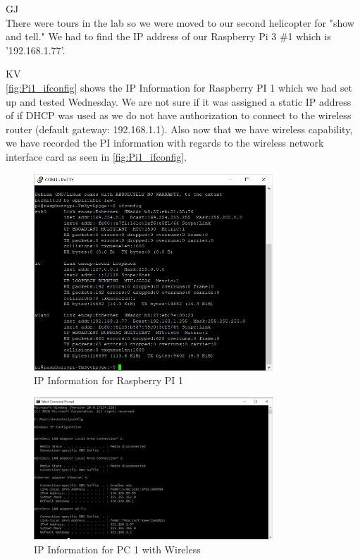 \documentclass[fontsize=11pt, %
                             paper=letter, %
                             openany, %
                             captions=tableheading,
                             index=totoc,
                             hyperref]{labbook}
\begin{document}
\begin{addmargin}[0cm]{0cm}
GJ\\
There were tours in the lab so we were moved to our second helicopter for "show and tell."  We had to find the IP address of our Raspberry Pi 3 \#1 which is '192.168.1.77'.

KV\\
\autoref{fig:Pi1_ifconfig} shows the IP Information for Raspberry PI 1 which we had set up and tested Wednesday.  We are not sure if it was assigned a static IP address of if DHCP was used as we do not have authorization to connect to the wireless router (default gateway: 192.168.1.1).  Also now that we have wireless capability, we have recorded the PI information with regards to the wireless network interface card as seen in \autoref{fig:Pi1_ifconfig}.

\begin{figure}[ht]
  \centering
  \includegraphics[width=0.8\textwidth]{figs/img/Pi1_ifconfig}
  \caption{IP Information for Raspberry PI 1}
  \label{fig:Pi1_ifconfig}
\end{figure}

\begin{figure}[h]
  \centering
  \includegraphics[width=0.8\textwidth]{figs/img/PC1_IP_withWireless}
  \caption{IP Information for PC 1 with Wireless}
  \label{fig:PC1_IP_withWireless}
\end{figure}


\end{addmargin}
\end{document}

